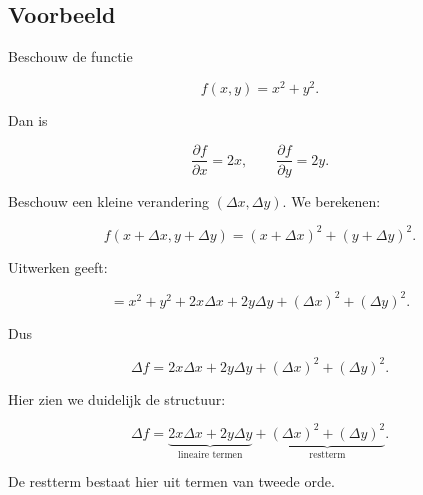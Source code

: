 \documentclass[11pt,a4paper]{article}
\begin{document}
    \subsection{Voorbeeld}

    Beschouw de functie

    \[
        f(x,y)=x^2+y^2.
    \]

    Dan is

    \[
        \frac{\partial f}{\partial x}=2x, \qquad
        \frac{\partial f}{\partial y}=2y.
    \]

    Beschouw een kleine verandering $(\Delta x,\Delta y)$.
    We berekenen:

    \[
        f(x+\Delta x,y+\Delta y)
        =
        (x+\Delta x)^2+(y+\Delta y)^2.
    \]

    Uitwerken geeft:

    \[
        =
        x^2+y^2+2x\Delta x+2y\Delta y+(\Delta x)^2+(\Delta y)^2.
    \]

    Dus

    \[
        \Delta f
        =
        2x\Delta x+2y\Delta y
        +
        (\Delta x)^2+(\Delta y)^2.
    \]

    Hier zien we duidelijk de structuur:

    \[
        \Delta f
        =
        \underbrace{2x\Delta x+2y\Delta y}_{\text{lineaire termen}}
        +
        \underbrace{(\Delta x)^2+(\Delta y)^2}_{\text{restterm}}.
    \]

    De restterm bestaat hier uit termen van tweede orde.
\end{document}

